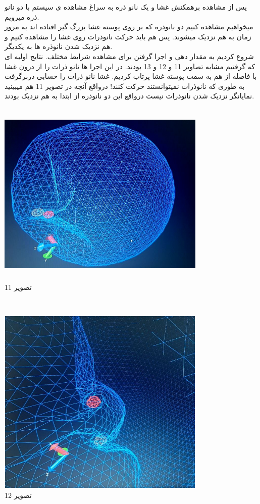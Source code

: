 \documentclass[12pt,onecolumn,a4paper]{report}
\begin{document}
پس از مشاهده برهمکنش غشا و یک نانو ذره به سراغ مشاهده ی سیستم با دو نانو ذره میرویم. \\
میخواهیم مشاهده کنیم دو نانوذره که بر روی پوسته غشا بزرگ گیر افتاده اند به مرور زمان به هم نزدیک میشوند. پس هم باید حرکت نانوذرات روی غشا را مشاهده کنیم و هم نزدیک شدن نانوذره ها به یکدیگر.\\
شروع کردیم به مقدار دهی و اجرا گرفتن برای مشاهده شرایط مختلف. نتایج اولیه ای که گرفتیم مشابه تصاویر 11 و 12 و 13 بودند. در این اجرا ها نانو ذرات را از درون غشا با فاصله از هم به سمت پوسته غشا پرتاب کردیم. غشا نانو ذرات را حسابی دربرگرفت به طوری که نانوذرات نمیتوانستند حرکت کنند! درواقع آنچه در تصویر 11 هم میبینید نمایانگر نزدیک شدن نانوذرات نیست درواقع این دو نانوذره از ابتدا به هم نزدیک بودند.\\
\begin{center}
\includegraphics[width=10cm, height=9cm]{11.jpg}\\
\caption{تصویر 11}
\end{center}\\
\begin{center}
\includegraphics[width=10cm, height=9cm]{12.jpg}\\
\caption{تصویر 12}
\end{center}\\
\end{document}
